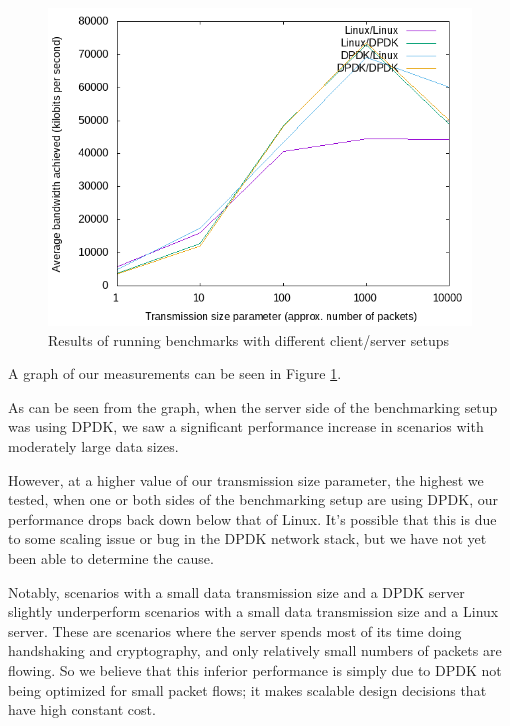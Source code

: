 \documentclass{sig-alternate-05-2015}
\begin{document}
\begin{figure}[bh]
\centering
\includegraphics[scale=0.5]{plot.png}
\caption{Results of running benchmarks with different client/server setups}
\label{fig:benchmark}
\end{figure}

A graph of our measurements can be seen in Figure \ref{fig:benchmark}.

As can be seen from the graph, when the server side of the benchmarking setup was using DPDK,
we saw a significant performance increase in scenarios with moderately large data sizes.

However, at a higher value of our transmission size parameter, the highest we tested,
when one or both sides of the benchmarking setup are using DPDK,
our performance drops back down below that of Linux.
It's possible that this is due to some scaling issue or bug in the DPDK network stack,
but we have not yet been able to determine the cause.

Notably, scenarios with a small data transmission size and a DPDK server
slightly underperform scenarios with a small data transmission size and a Linux server.
These are scenarios where the server spends most of its time doing handshaking and cryptography,
and only relatively small numbers of packets are flowing.
So we believe that this inferior performance is simply due to DPDK not being optimized for small packet flows;
it makes scalable design decisions that have high constant cost.
\end{document}
